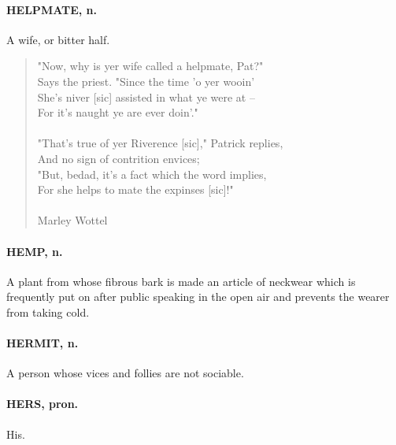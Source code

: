 \documentclass[11pt]{article}
\begin{document}
\paragraph{HELPMATE, n.}  A wife, or bitter half.

\begin{quote}   "Now, why is yer wife called a helpmate, Pat?" \\
      Says the priest.  "Since the time 'o yer wooin' \\
  She's niver [sic] assisted in what ye were at -- \\
      For it's naught ye are ever doin'." \\
 \\
  "That's true of yer Riverence [sic]," Patrick replies, \\
      And no sign of contrition envices; \\
  "But, bedad, it's a fact which the word implies, \\
      For she helps to mate the expinses [sic]!" \\
 \\
Marley Wottel \end{quote}


\paragraph{HEMP, n.}  A plant from whose fibrous bark is made an article of
neckwear which is frequently put on after public speaking in the open
air and prevents the wearer from taking cold.

\paragraph{HERMIT, n.}  A person whose vices and follies are not sociable.

\paragraph{HERS, pron.}  His.
\end{document}

